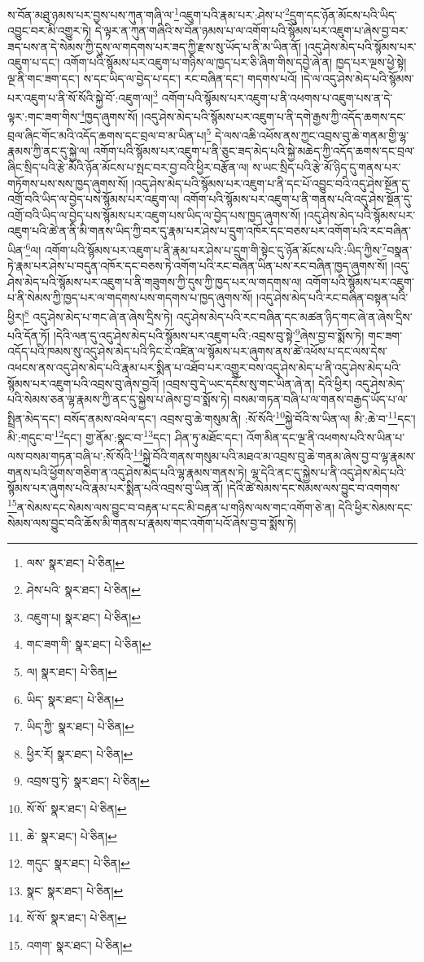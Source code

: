 ས་བོན་མཐུ་ཉམས་པར་བྱས་པས་ཀུན་གཞི་ལ་\footnote{ལས་  སྣར་ཐང་།  པེ་ཅིན། }འཇུག་པའི་རྣམ་པར་:ཤེས་པ་\footnote{ཤེས་པའི་  སྣར་ཐང་།  པེ་ཅིན། }དྲུག་དང་ཉོན་མོངས་པའི་ཡིད་འབྱུང་བར་མི་འགྱུར་ཏེ། དེ་ལྟར་ན་ཀུན་གཞིའི་ས་བོན་ཉམས་པ་ལ་འགོག་པའི་སྙོམས་པར་འཇུག་པ་ཞེས་བྱ་བར་ཟད་པས་ན་དེ་སེམས་ཀྱི་དུས་ལ་གདགས་པར་ཟད་ཀྱི་རྫས་སུ་ཡོད་པ་ནི་མ་ཡིན་ནོ། །འདུ་ཤེས་མེད་པའི་སྙོམས་པར་འཇུག་པ་དང་། འགོག་པའི་སྙོམས་པར་འཇུག་པ་གཉིས་ལ་ཁྱད་པར་ཅི་ཞིག་གིས་དབྱེ་ཞེ་ན། ཁྱད་པར་ལྔས་ཕྱེ་སྟེ། ལྔ་ནི་གང་ཟག་དང་། ས་དང་ཡིད་ལ་བྱེད་པ་དང་། རང་བཞིན་དང་། གདགས་པའོ། །དེ་ལ་འདུ་ཤེས་མེད་པའི་སྙོམས་པར་འཇུག་པ་ནི་སོ་སོའི་སྐྱེ་བོ་:འཇུག་ལ།\footnote{འཇུག་པ།  སྣར་ཐང་།  པེ་ཅིན། } འགོག་པའི་སྙོམས་པར་འཇུག་པ་ནི་འཕགས་པ་འཇུག་པས་ན་དེ་ལྟར་:གང་ཟག་གིས་\footnote{གང་ཟག་གི་  སྣར་ཐང་།  པེ་ཅིན། }ཁྱད་ཞུགས་སོ། །འདུ་ཤེས་མེད་པའི་སྙོམས་པར་འཇུག་པ་ནི་དགེ་རྒྱས་ཀྱི་འདོད་ཆགས་དང་བྲལ་ཞིང་གོང་མའི་འདོད་ཆགས་དང་བྲལ་བ་མ་ཡིན་པ།\footnote{ལ།  སྣར་ཐང་།  པེ་ཅིན། } དེ་ལས་འཆི་འཕོས་ནས་ཀྱང་འབྲས་བུ་ཆེ་གནམ་གྱི་ལྷ་རྣམས་ཀྱི་ནང་དུ་སྐྱེ་ལ། འགོག་པའི་སྙོམས་པར་འཇུག་པ་ནི་ཅུང་ཟད་མེད་པའི་སྐྱེ་མཆེད་ཀྱི་འདོད་ཆགས་དང་བྲལ་ཞིང་སྲིད་པའི་རྩེ་མོའི་ཉོན་མོངས་པ་སྤང་བར་བྱ་བའི་ཕྱིར་བརྩོན་ལ། ས་ཡང་སྲིད་པའི་རྩེ་མོ་ཉིད་དུ་གནས་པར་གཏོགས་པས་སས་ཁྱད་ཞུགས་སོ། །འདུ་ཤེས་མེད་པའི་སྙོམས་པར་འཇུག་པ་ནི་དང་པོ་འབྱུང་བའི་འདུ་ཤེས་སྔོན་དུ་འགྲོ་བའི་ཡིད་ལ་བྱེད་པས་སྙོམས་པར་འཇུག་ལ། འགོག་པའི་སྙོམས་པར་འཇུག་པ་ནི་གནས་པའི་འདུ་ཤེས་སྔོན་དུ་འགྲོ་བའི་ཡིད་ལ་བྱེད་པས་སྙོམས་པར་འཇུག་པས་ཡིད་ལ་བྱེད་པས་ཁྱད་ཞུགས་སོ། །འདུ་ཤེས་མེད་པའི་སྙོམས་པར་འཇུག་པའི་ཚེ་ན་ནི་མི་གནས་ཡིད་ཀྱི་བར་དུ་རྣམ་པར་ཤེས་པ་དྲུག་འཁོར་དང་བཅས་པར་འགོག་པའི་རང་བཞིན་ཡིན་\footnote{ཡིད་  སྣར་ཐང་།  པེ་ཅིན། }ལ། འགོག་པའི་སྙོམས་པར་འཇུག་པ་ནི་རྣམ་པར་ཤེས་པ་དྲུག་གི་སྟེང་དུ་ཉོན་མོངས་པའི་:ཡིད་ཀྱིས་\footnote{ཡིད་ཀྱི་  སྣར་ཐང་།  པེ་ཅིན། }བསྣན་ཏེ་རྣམ་པར་ཤེས་པ་བདུན་འཁོར་དང་བཅས་ཏེ་འགོག་པའི་རང་བཞིན་ཡིན་པས་རང་བཞིན་ཁྱད་ཞུགས་སོ། །འདུ་ཤེས་མེད་པའི་སྙོམས་པར་འཇུག་པ་ནི་གཟུགས་ཀྱི་དུས་ཀྱི་ཁྱད་པར་ལ་གདགས་ལ། འགོག་པའི་སྙོམས་པར་འཇུག་པ་ནི་སེམས་ཀྱི་ཁྱད་པར་ལ་གདགས་པས་གདགས་པ་ཁྱད་ཞུགས་སོ། །འདུ་ཤེས་མེད་པའི་རང་བཞིན་བསྟན་པའི་ཕྱིར།\footnote{ཕྱིར་རོ།  སྣར་ཐང་།  པེ་ཅིན། } འདུ་ཤེས་མེད་པ་གང་ཞེ་ན་ཞེས་དྲིས་ཏེ། འདུ་ཤེས་མེད་པའི་རང་བཞིན་དང་མཚན་ཉིད་གང་ཞེ་ན་ཞེས་དྲིས་པའི་དོན་ཏོ། །དེའི་ལན་དུ་འདུ་ཤེས་མེད་པའི་སྙོམས་པར་འཇུག་པའི་:འབྲས་བུ་སྟེ་\footnote{འབྲས་བུ་ཏེ་  སྣར་ཐང་།  པེ་ཅིན། }ཞེས་བྱ་བ་སྨོས་ཏེ། གང་ཟག་འདོད་པའི་ཁམས་སུ་འདུ་ཤེས་མེད་པའི་ཏིང་ངེ་འཛིན་ལ་སྙོམས་པར་ཞུགས་ནས་ཚེ་འཕོས་པ་དང་ལས་དེས་འཕངས་ནས་འདུ་ཤེས་མེད་པའི་རྣམ་པར་སྨིན་པ་འཐོབ་པར་འགྱུར་བས་འདུ་ཤེས་མེད་པ་ནི་འདུ་ཤེས་མེད་པའི་སྙོམས་པར་འཇུག་པའི་འབྲས་བུ་ཞེས་བྱའོ། །འབྲས་བུ་དེ་ཡང་དངོས་སུ་གང་ཡིན་ཞེ་ན། དེའི་ཕྱིར། འདུ་ཤེས་མེད་པའི་སེམས་ཅན་ལྷ་རྣམས་ཀྱི་ནང་དུ་སྐྱེས་པ་ཞེས་བྱ་བ་སྨོས་ཏེ། བསམ་གཏན་བཞི་པ་ལ་གནས་བརྒྱད་ཡོད་པ་ལ་སྤྲིན་མེད་དང་། བསོད་ནམས་འཕེལ་དང་། འབྲས་བུ་ཆེ་གསུམ་ནི། :སོ་སོའི་\footnote{སོ་སོ་  སྣར་ཐང་།  པེ་ཅིན། }སྐྱེ་བོའི་ས་ཡིན་ལ། མི་:ཆེ་བ་\footnote{ཆེ་  སྣར་ཐང་།  པེ་ཅིན། }དང་། མི་:གདུང་བ་\footnote{གདུང་  སྣར་ཐང་།  པེ་ཅིན། }དང་། གྱ་ནོམ་:སྣང་བ་\footnote{སྣང་  སྣར་ཐང་།  པེ་ཅིན། }དང་། ཤིན་ཏུ་མཐོང་དང་། འོག་མིན་དང་ལྔ་ནི་འཕགས་པའི་ས་ཡིན་པ་ལས་བསམ་གཏན་བཞི་པ་:སོ་སོའི་\footnote{སོ་སོ་  སྣར་ཐང་།  པེ་ཅིན། }སྐྱེ་བོའི་གནས་གསུམ་པའི་མཐའ་མ་འབྲས་བུ་ཆེ་གནམ་ཞེས་བྱ་བ་ལྷ་རྣམས་གནས་པའི་ཕྱོགས་གཅིག་ན་འདུ་ཤེས་མེད་པའི་ལྷ་རྣམས་གནས་ཏེ། ལྷ་དེའི་ནང་དུ་སྐྱེས་པ་ནི་འདུ་ཤེས་མེད་པའི་སྙོམས་པར་ཞུགས་པའི་རྣམ་པར་སྨིན་པའི་འབྲས་བུ་ཡིན་ནོ། །དེའི་ཚེ་སེམས་དང་སེམས་ལས་བྱུང་བ་འགགས་\footnote{འགག་  སྣར་ཐང་།  པེ་ཅིན། }ན་སེམས་དང་སེམས་ལས་བྱུང་བ་བརྟན་པ་དང་མི་བརྟན་པ་གཉིས་ལས་གང་འགོག་ཅེ་ན། དེའི་ཕྱིར་སེམས་དང་སེམས་ལས་བྱུང་བའི་ཆོས་མི་གནས་པ་རྣམས་གང་འགོག་པའོ་ཞེས་བྱ་བ་སྨོས་ཏེ། 